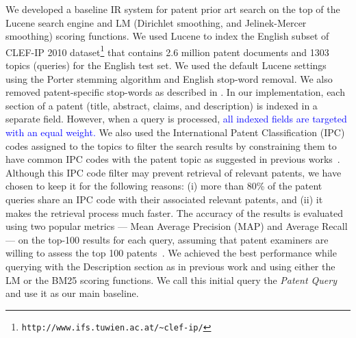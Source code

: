 We developed a baseline IR system for patent prior art search on the top of
the Lucene search engine
and LM (Dirichlet
smoothing, and Jelinek-Mercer smoothing)
scoring functions. %
We used Lucene to index the English subset of CLEF-IP 2010 dataset\footnote{\texttt{http://www.ifs.tuwien.ac.at/\textasciitilde{}clef-ip/}} 
that contains 2.6 million patent documents and 1303 topics (queries) for the English test set.
We used the default Lucene settings using the Porter stemming algorithm 
and English stop-word removal. 
We also removed patent-specific stop-words as described in \cite{magdy2012toward}.
In
our implementation, each section of a patent (title, abstract, claims,
and description) is indexed in a separate field. However, when a query 
is processed, \textcolor{blue}{all indexed fields are targeted with an equal weight.}
We also used the International
Patent Classification (IPC) codes assigned to the topics to filter
the search results by constraining them to have common IPC codes with
the patent topic as suggested in previous works~\cite{lopez2010experiments}.
Although this IPC code filter may prevent retrieval of relevant patents, we
have chosen to keep it for the following reasons: (i) more than 80\%
of the patent queries share an IPC code with their associated relevant
patents, and (ii) it makes the retrieval process much faster. The accuracy of the results is evaluated using two popular metrics --- Mean Average Precision (MAP) and Average Recall --- on the top-100 results for each query, assuming that patent examiners are willing to assess the top 100 patents~\cite{joho2010survey}. 
We achieved the best performance while querying with the Description
section as in previous work \cite{xue2009transforming} and using
either the LM or the BM25 scoring functions. We call this initial
query the \textit{Patent Query} and use it as our main baseline.

